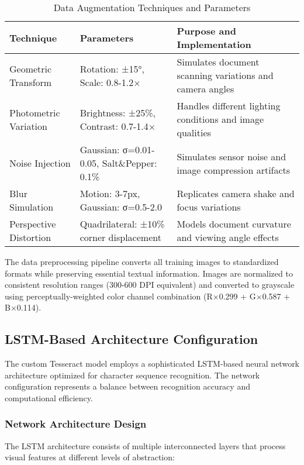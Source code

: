 \begin{table}[H]
\centering
\caption{Data Augmentation Techniques and Parameters}
\label{tab:augmentation_techniques}
\begin{tabular}{|l|l|p{6cm}|}
\hline
\textbf{Technique} & \textbf{Parameters} & \textbf{Purpose and Implementation} \\
\hline
Geometric Transform & Rotation: ±15°, Scale: 0.8-1.2× & Simulates document scanning variations and camera angles \\
\hline
Photometric Variation & Brightness: ±25\%, Contrast: 0.7-1.4× & Handles different lighting conditions and image qualities \\
\hline
Noise Injection & Gaussian: σ=0.01-0.05, Salt\&Pepper: 0.1\% & Simulates sensor noise and image compression artifacts \\
\hline
Blur Simulation & Motion: 3-7px, Gaussian: σ=0.5-2.0 & Replicates camera shake and focus variations \\
\hline
Perspective Distortion & Quadrilateral: ±10\% corner displacement & Models document curvature and viewing angle effects \\
\hline
\end{tabular}
\end{table}

The data preprocessing pipeline converts all training images to standardized formats while preserving essential textual information. Images are normalized to consistent resolution ranges (300-600 DPI equivalent) and converted to grayscale using perceptually-weighted color channel combination (R×0.299 + G×0.587 + B×0.114).

\subsection{LSTM-Based Architecture Configuration}

The custom Tesseract model employs a sophisticated LSTM-based neural network architecture optimized for character sequence recognition. The network configuration represents a balance between recognition accuracy and computational efficiency.

\subsubsection{Network Architecture Design}

The LSTM architecture consists of multiple interconnected layers that process visual features at different levels of abstraction:

